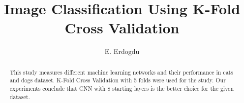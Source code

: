 \begin{frontmatter}
%
\title{%
Image Classification Using K-Fold Cross Validation\\
\small 
}
%
\author[NTNUphysics]{E. Erdogdu} 
%
%
\renewcommand*{\today}{\MonthYearDateFormat\displaydate{dateName}} 
%
\begin{abstract}

This study measures different machine learning networks and their performance in cats and dogs dataset. K-Fold Cross Validation with 5 folds were used for the study. Our experiments conclude that CNN with 8 starting layers is the better choice for the given dataset.

\end{abstract}
%
\end{frontmatter}
%
%
%


